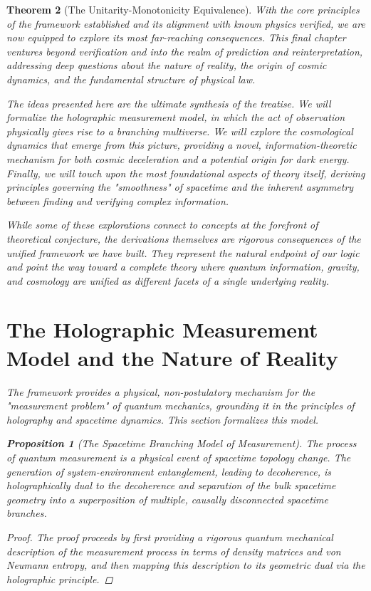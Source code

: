 \documentclass[11pt, letterpaper]{report}
\theoremstyle{plain} %
\newtheorem{theorem}{Theorem}[chapter]
\newtheorem{proposition}[theorem]{Proposition}
\theoremstyle{definition} %
\theoremstyle{remark} %
\begin{document}
\begin{theorem}[The Unitarity-Monotonicity Equivalence]
With the core principles of the framework established and its alignment with known physics verified, we are now equipped to explore its most far-reaching consequences. This final chapter ventures beyond verification and into the realm of prediction and reinterpretation, addressing deep questions about the nature of reality, the origin of cosmic dynamics, and the fundamental structure of physical law.

The ideas presented here are the ultimate synthesis of the treatise. We will formalize the holographic measurement model, in which the act of observation physically gives rise to a branching multiverse. We will explore the cosmological dynamics that emerge from this picture, providing a novel, information-theoretic mechanism for both cosmic deceleration and a potential origin for dark energy. Finally, we will touch upon the most foundational aspects of theory itself, deriving principles governing the "smoothness" of spacetime and the inherent asymmetry between finding and verifying complex information.

While some of these explorations connect to concepts at the forefront of theoretical conjecture, the derivations themselves are rigorous consequences of the unified framework we have built. They represent the natural endpoint of our logic and point the way toward a complete theory where quantum information, gravity, and cosmology are unified as different facets of a single underlying reality.

\section{The Holographic Measurement Model and the Nature of Reality}
\label{sec:explore_measurement}

The framework provides a physical, non-postulatory mechanism for the "measurement problem" of quantum mechanics, grounding it in the principles of holography and spacetime dynamics. This section formalizes this model.

\begin{proposition}[The Spacetime Branching Model of Measurement]
\label{prop:explore_branching}
The process of quantum measurement is a physical event of spacetime topology change. The generation of system-environment entanglement, leading to decoherence, is holographically dual to the decoherence and separation of the bulk spacetime geometry into a superposition of multiple, causally disconnected spacetime branches.
\end{proposition}
\begin{proof}
The proof proceeds by first providing a rigorous quantum mechanical description of the measurement process in terms of density matrices and von Neumann entropy, and then mapping this description to its geometric dual via the holographic principle.


\end{proof}
\end{theorem}
\end{document}
